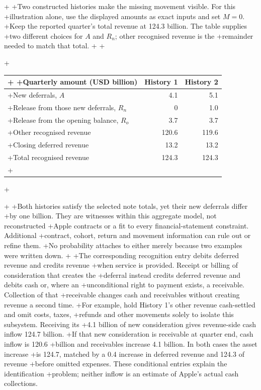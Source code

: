 +
+Two constructed histories make the missing movement visible. For this
+illustration alone, use the displayed amounts as exact inputs and set $M=0$.
+Keep the reported quarter's total revenue at 124.3 billion. The table supplies
+two different choices for $A$ and $R_n$; other recognised revenue is the
+remainder needed to match that total.
+
+\begin{center}
+\begin{tabularx}{\linewidth}{@{}Xrr@{}}
+\toprule
+Quarterly amount (USD billion) & History 1 & History 2\\\midrule
+New deferrals, $A$ & 4.1 & 5.1\\
+Release from those new deferrals, $R_n$ & 0 & 1.0\\
+Release from the opening balance, $R_o$ & 3.7 & 3.7\\
+Other recognised revenue & 120.6 & 119.6\\
+Closing deferred revenue & 13.2 & 13.2\\
+Total recognised revenue & 124.3 & 124.3\\\bottomrule
+\end{tabularx}
+\end{center}
+
+Both histories satisfy the selected note totals, yet their new deferrals differ
+by one billion. They are witnesses within this aggregate model, not reconstructed
+Apple contracts or a fit to every financial-statement constraint. Additional
+contract, cohort, return and movement information can rule out or refine them.
+No probability attaches to either merely because two examples were written down.
+
+The corresponding recognition entry debits deferred revenue and credits revenue
+when service is provided. Receipt or billing of consideration that creates the
+deferral instead credits deferred revenue and debits cash or, where an
+unconditional right to payment exists, a receivable. Collection of that
+receivable changes cash and receivables without creating revenue a second time.
+For example, hold History 1's other revenue cash-settled and omit costs, taxes,
+refunds and other movements solely to isolate this subsystem. Receiving its
+4.1 billion of new consideration gives revenue-side cash inflow 124.7 billion.
+If that new consideration is receivable at quarter end, cash inflow is 120.6
+billion and receivables increase 4.1 billion. In both cases the asset increase
+is 124.7, matched by a 0.4 increase in deferred revenue and 124.3 of revenue
+before omitted expenses. These conditional entries explain the identification
+problem; neither inflow is an estimate of Apple's actual cash collections.
